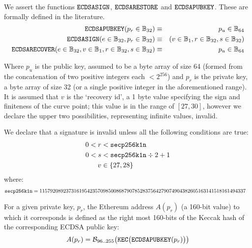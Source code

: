 \documentclass[9pt,oneside]{amsart}
\begin{document}
We assert the functions $\mathtt{\small ECDSASIGN}$, $\mathtt{\small ECDSARESTORE}$ and $\mathtt{\small ECDSAPUBKEY}$. These are formally defined in the literature.
\begin{eqnarray}
\mathtt{\small ECDSAPUBKEY}(p_r \in \mathbb{B}_{32}) & \equiv & p_u \in \mathbb{B}_{64} \\
\mathtt{\small ECDSASIGN}(e \in \mathbb{B}_{32}, p_r \in \mathbb{B}_{32}) & \equiv & (v \in \mathbb{B}_{1}, r \in \mathbb{B}_{32}, s \in \mathbb{B}_{32}) \\
\mathtt{\small ECDSARECOVER}(e \in \mathbb{B}_{32}, v \in \mathbb{B}_{1}, r \in \mathbb{B}_{32}, s \in \mathbb{B}_{32}) & \equiv & p_u \in \mathbb{B}_{64}
\end{eqnarray}

Where $p_u$ is the public key, assumed to be a byte array of size 64 (formed from the concatenation of two positive integers each $< 2^{256}$) and $p_r$ is the private key, a byte array of size 32 (or a single positive integer in the aforementioned range). It is assumed that $v$ is the `recovery id', a 1 byte value specifying the sign and finiteness of the curve point; this value is in the range of $[27, 30]$, however we declare the upper two possibilities, representing infinite values, invalid.

\newcommand{\slimit}{\ensuremath{\text{s-limit}}}

We declare that a signature is invalid unless all the following conditions are true:
\begin{align}
0 < r &< \mathtt{\tiny secp256k1n} \\
0 < s &< \mathtt{\tiny secp256k1n} \div 2 + 1 \\
v &\in \{27,28\}
\end{align}
where:
\begin{align}
\mathtt{\tiny secp256k1n} &= 115792089237316195423570985008687907852837564279074904382605163141518161494337
\end{align}

For a given private key, $p_r$, the Ethereum address $A(p_r)$ (a 160-bit value) to which it corresponds is defined as the right most 160-bits of the Keccak hash of the corresponding ECDSA public key:
\begin{equation}
A(p_r) = \mathcal{B}_{96..255}\big(\mathtt{\tiny KEC}\big( \mathtt{\small ECDSAPUBKEY}(p_r) \big) \big)
\end{equation}
\end{document}
